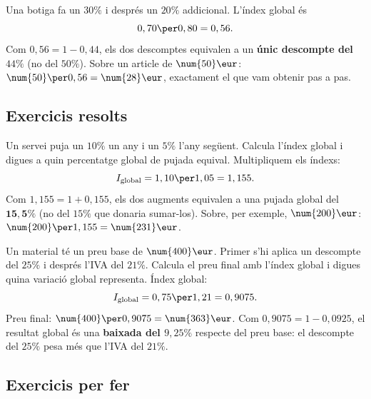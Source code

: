 \begin{exemple}
Una botiga fa un $30\%$ i després un $20\%$ addicional. L'índex global és
\[
0,70\per 0,80=0,56.
\]
Com $0,56=1-0,44$, els dos descomptes equivalen a un \textbf{únic descompte del
$44\%$} (no del $50\%$). Sobre un article de $\num{50}\eur$:
$\num{50}\per 0,56=\num{28}\eur$, exactament el que vam obtenir pas a pas.
\end{exemple}

\subsection{Exercicis resolts}

\begin{exresolt}
Un servei puja un $10\%$ un any i un $5\%$ l'any següent. Calcula l'índex global i
digues a quin percentatge global de pujada equival.
\solucio
Multipliquem els índexs:
\[
I_{\text{global}}=1,10\per 1,05=1,155.
\]
Com $1,155=1+0,155$, els dos augments equivalen a una pujada global del
$\mathbf{15,5\%}$ (no del $15\%$ que donaria sumar-los). Sobre, per exemple,
$\num{200}\eur$: $\num{200}\per 1,155=\num{231}\eur$.
\end{exresolt}

\begin{exresolt}
Un material té un preu base de $\num{400}\eur$. Primer s'hi aplica un descompte del
$25\%$ i després l'IVA del $21\%$. Calcula el preu final amb l'índex global i digues
quina variació global representa.
\solucio
Índex global:
\[
I_{\text{global}}=0,75\per 1,21=0,9075.
\]
Preu final: $\num{400}\per 0,9075=\num{363}\eur$. Com $0,9075=1-0,0925$, el resultat
global és una \textbf{baixada del $9,25\%$} respecte del preu base: el descompte del
$25\%$ pesa més que l'IVA del $21\%$.
\end{exresolt}

\subsection{Exercicis per fer}

